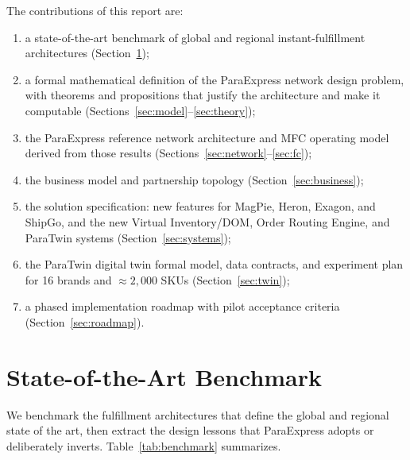 \documentclass[journal]{IEEEtran}
\begin{document}
The contributions of this report are:
\begin{enumerate}[leftmargin=*]
  \item a state-of-the-art benchmark of global and regional instant-fulfillment architectures (Section~\ref{sec:benchmark});
  \item a formal mathematical definition of the ParaExpress network design problem, with theorems and propositions that justify the architecture and make it computable (Sections~\ref{sec:model}--\ref{sec:theory});
  \item the ParaExpress reference network architecture and MFC operating model derived from those results (Sections~\ref{sec:network}--\ref{sec:fc});
  \item the business model and partnership topology (Section~\ref{sec:business});
  \item the solution specification: new features for MagPie, Heron, Exagon, and ShipGo, and the new Virtual Inventory/DOM, Order Routing Engine, and ParaTwin systems (Section~\ref{sec:systems});
  \item the ParaTwin digital twin formal model, data contracts, and experiment plan for 16 brands and ${\approx}2{,}000$ SKUs (Section~\ref{sec:twin});
  \item a phased implementation roadmap with pilot acceptance criteria (Section~\ref{sec:roadmap}).
\end{enumerate}

\section{State-of-the-Art Benchmark}
\label{sec:benchmark}
We benchmark the fulfillment architectures that define the global and regional state of the art, then extract the design lessons that ParaExpress adopts or deliberately inverts. Table~\ref{tab:benchmark} summarizes.
\end{document}
